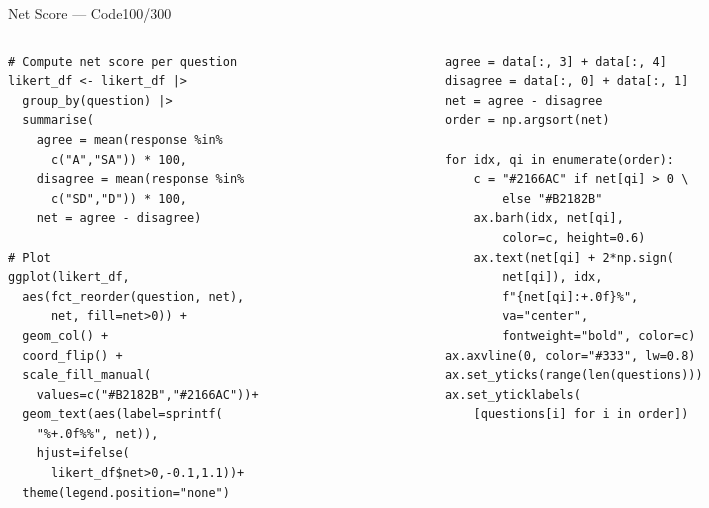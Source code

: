\documentclass[10pt]{beamer}
\newcommand{\smark}[1]{\hfill{\scriptsize\color{codegray}#1}}
\begin{document}
\begin{frame}[fragile]{Net Score --- Code}\smark{100/300}
\begin{columns}[T]
\begin{column}{0.48\textwidth}
\begin{lstlisting}[style=Rstyle]
# Compute net score per question
likert_df <- likert_df |>
  group_by(question) |>
  summarise(
    agree = mean(response %in%
      c("A","SA")) * 100,
    disagree = mean(response %in%
      c("SD","D")) * 100,
    net = agree - disagree)

# Plot
ggplot(likert_df,
  aes(fct_reorder(question, net),
      net, fill=net>0)) +
  geom_col() +
  coord_flip() +
  scale_fill_manual(
    values=c("#B2182B","#2166AC"))+
  geom_text(aes(label=sprintf(
    "%+.0f%%", net)),
    hjust=ifelse(
      likert_df$net>0,-0.1,1.1))+
  theme(legend.position="none")
\end{lstlisting}
\end{column}
\begin{column}{0.48\textwidth}
\begin{lstlisting}[style=Pystyle]
agree = data[:, 3] + data[:, 4]
disagree = data[:, 0] + data[:, 1]
net = agree - disagree
order = np.argsort(net)

for idx, qi in enumerate(order):
    c = "#2166AC" if net[qi] > 0 \
        else "#B2182B"
    ax.barh(idx, net[qi],
        color=c, height=0.6)
    ax.text(net[qi] + 2*np.sign(
        net[qi]), idx,
        f"{net[qi]:+.0f}%",
        va="center",
        fontweight="bold", color=c)
ax.axvline(0, color="#333", lw=0.8)
ax.set_yticks(range(len(questions)))
ax.set_yticklabels(
    [questions[i] for i in order])
\end{lstlisting}
\end{column}
\end{columns}
\end{frame}
\end{document}
